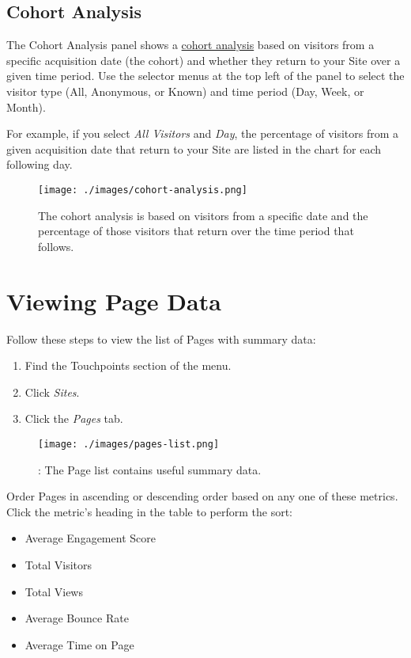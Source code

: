 \subsection{Cohort Analysis}\label{cohort-analysis}

The Cohort Analysis panel shows a
\href{https://en.wikipedia.org/wiki/Cohort_analysis}{cohort analysis}
based on visitors from a specific acquisition date (the cohort) and
whether they return to your Site over a given time period. Use the
selector menus at the top left of the panel to select the visitor type
(All, Anonymous, or Known) and time period (Day, Week, or Month).

For example, if you select \emph{All Visitors} and \emph{Day}, the
percentage of visitors from a given acquisition date that return to your
Site are listed in the chart for each following day.

\begin{figure}
\centering
\texttt{[image: ./images/cohort-analysis.png]}
\caption{The cohort analysis is based on visitors from a specific date
and the percentage of those visitors that return over the time period
that follows.}
\end{figure}

\section{Viewing Page Data}\label{viewing-page-data}

Follow these steps to view the list of Pages with summary data:

\begin{enumerate}
\def\labelenumi{\arabic{enumi}.}
\item
  Find the Touchpoints section of the menu.
\item
  Click \emph{Sites}.
\item
  Click the \emph{Pages} tab.
\end{enumerate}

\begin{figure}
\centering
\texttt{[image: ./images/pages-list.png]}
\caption{: The Page list contains useful summary data.}
\end{figure}

Order Pages in ascending or descending order based on any one of these
metrics. Click the metric's heading in the table to perform the sort:

\begin{itemize}
\tightlist
\item
  Average Engagement Score
\item
  Total Visitors
\item
  Total Views
\item
  Average Bounce Rate
\item
  Average Time on Page
\end{itemize}

